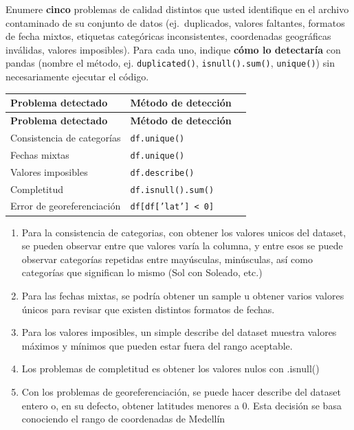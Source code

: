 \documentclass[11pt]{article}
\begin{document}
\begin{pregunta}
Enumere \textbf{cinco} problemas de calidad distintos que usted identifique en el archivo contaminado de su conjunto de datos (ej.\ duplicados, valores faltantes, formatos de fecha mixtos, etiquetas categóricas inconsistentes, coordenadas geográficas inválidas, valores imposibles). Para cada uno, indique \textbf{cómo lo detectaría} con pandas (nombre el método, ej. \texttt{duplicated()}, \texttt{isnull().sum()}, \texttt{unique()}) sin necesariamente ejecutar el código.
\end{pregunta}

\begin{longtable}{@{} p{3.2cm} p{3.5cm} p{6cm} @{}}
\toprule
\textbf{Problema detectado} & \textbf{Método de detección} \\
\midrule
\endfirsthead

\toprule
\textbf{Problema detectado} & \textbf{Método de detección} \\
\midrule
\endhead

\bottomrule
\endfoot

Consistencia de categorías & \texttt{df.unique()} \\
\midrule

Fechas mixtas & \texttt{df.unique()} \\
\midrule

Valores imposibles & \texttt{df.describe()} \\
\midrule

Completitud & \texttt{df.isnull().sum()} \\
\midrule

Error de georeferenciación & \texttt{df[df['lat'] < 0]} \\
\midrule

\end{longtable}

\begin{enumerate}
    \item Para la consistencia de categorias, con obtener los valores unicos del dataset, se pueden observar entre que valores varía la columna, y entre esos se puede observar categorías repetidas entre mayúsculas, minúsculas, así como categorías que significan lo mismo (Sol con Soleado, etc.)
    \item Para las fechas mixtas, se podría obtener un sample u obtener varios valores únicos para revisar que existen distintos formatos de fechas.
    \item Para los valores imposibles, un simple describe del dataset muestra valores máximos y mínimos que pueden estar fuera del rango aceptable.
    \item Los problemas de completitud es obtener los valores nulos con .isnull()
    \item Con los problemas de georeferenciación, se puede hacer describe del dataset entero o, en su defecto, obtener latitudes menores a 0. Esta decisión se basa conociendo el rango de coordenadas de Medellín
\end{enumerate}
\end{document}
